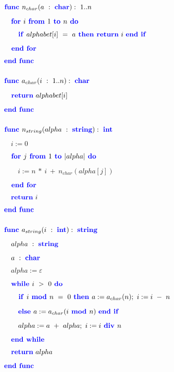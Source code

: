 \documentclass[12pt, a4paper]{article}
\begin{document}
$\text{\color{blue} \textbf{func }}n_{char}(a\ :\ \text{\color{blue} \textbf{char}}) :\ 1..n$

$\quad \text{\color{blue} \textbf{for }}i\text{\color{blue} \textbf{ from }}1\text{\color{blue} \textbf{ to }}n\text{\color{blue} \textbf{ do }}$

$\quad \quad \text{\color{blue} \textbf{if }}alphabet[i]\ =\ a\text{\color{blue} \textbf{ then }}\text{\color{blue} \textbf{return}}\ i\ \text{\color{blue} \textbf{end }}\text{\color{blue} \textbf{if }}$

$\quad \text{\color{blue} \textbf{end for}}$

$\text{\color{blue} \textbf{end func }}$

$ $

$\text{\color{blue} \textbf{func }}a_{char}(i\ :\ 1..n) :\ \text{\color{blue} \textbf{char}}$

$\quad \text{\color{blue} \textbf{return}}\ alphabet[i]\ $

$\text{\color{blue} \textbf{end func }}$

$ $

$\text{\color{blue} \textbf{func }}n_{string}(alpha\ :\ \text{\color{blue} \textbf{string}}) :\ \text{\color{blue} \textbf{int}}$

$\quad i := 0\ $

$\quad \text{\color{blue} \textbf{for }}j\text{\color{blue} \textbf{ from }}1\text{\color{blue} \textbf{ to }}|alpha|\text{\color{blue} \textbf{ do }}$

$\quad \quad i := n\ *\ i\ +\ n_{char}(alpha[j])\ $

$\quad \text{\color{blue} \textbf{end for}}$

$\quad \text{\color{blue} \textbf{return}}\ i\ $

$\text{\color{blue} \textbf{end func }}$

$ $

$\text{\color{blue} \textbf{func }}a_{string}(i\ :\ \text{\color{blue} \textbf{int}}) :\ \text{\color{blue} \textbf{string}}$

$\quad alpha\ :\ \text{\color{blue} \textbf{string}}\ $

$\quad a\ :\ \text{\color{blue} \textbf{char}}\ $

$\quad alpha := \varepsilon\ $

$\quad \text{\color{blue} \textbf{while }}i\ >\ 0\text{\color{blue} \textbf{ do }}$

$\quad \quad \text{\color{blue} \textbf{if }}i\text{\color{blue} \textbf{ mod }}n\ =\ 0\text{\color{blue} \textbf{ then }}a := a_{char}(n);\ i := i\ -\ n\ $

$\quad \quad \text{\color{blue} \textbf{else }}a := a_{char}(i\text{\color{blue} \textbf{ mod }}n)\ \text{\color{blue} \textbf{end }}\text{\color{blue} \textbf{if }}$

$\quad \quad alpha := a\ +\ alpha;\ i := i\text{\color{blue} \textbf{ div }}n\ $

$\quad \text{\color{blue} \textbf{end while}}$

$\quad \text{\color{blue} \textbf{return}}\ alpha\ $

$\text{\color{blue} \textbf{end func }}$

$ $
\end{document}
